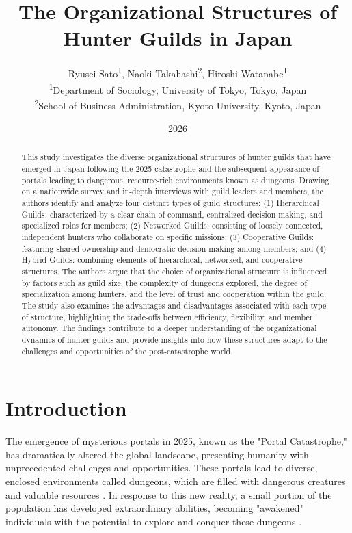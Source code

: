 \documentclass[12pt, a4paper]{article}
\title{The Organizational Structures of Hunter Guilds in Japan}
\author{
    Ryusei Sato\textsuperscript{1},
    Naoki Takahashi\textsuperscript{2},
    Hiroshi Watanabe\textsuperscript{1} \\
    \textsuperscript{1}Department of Sociology, University of Tokyo, Tokyo, Japan \\
    \textsuperscript{2}School of Business Administration, Kyoto University, Kyoto, Japan
}
\date{2026}
\begin{document}
\maketitle

\begin{abstract}
This study investigates the diverse organizational structures of hunter guilds that have emerged in Japan following the 2025 catastrophe and the subsequent appearance of portals leading to dangerous, resource-rich environments known as dungeons. Drawing on a nationwide survey and in-depth interviews with guild leaders and members, the authors identify and analyze four distinct types of guild structures: (1) Hierarchical Guilds: characterized by a clear chain of command, centralized decision-making, and specialized roles for members; (2) Networked Guilds: consisting of loosely connected, independent hunters who collaborate on specific missions; (3) Cooperative Guilds: featuring shared ownership and democratic decision-making among members; and (4) Hybrid Guilds: combining elements of hierarchical, networked, and cooperative structures. The authors argue that the choice of organizational structure is influenced by factors such as guild size, the complexity of dungeons explored, the degree of specialization among hunters, and the level of trust and cooperation within the guild. The study also examines the advantages and disadvantages associated with each type of structure, highlighting the trade-offs between efficiency, flexibility, and member autonomy. The findings contribute to a deeper understanding of the organizational dynamics of hunter guilds and provide insights into how these structures adapt to the challenges and opportunities of the post-catastrophe world.
\end{abstract}

\section{Introduction}
The emergence of mysterious portals in 2025, known as the "Portal Catastrophe," has dramatically altered the global landscape, presenting humanity with unprecedented challenges and opportunities. These portals lead to diverse, enclosed environments called dungeons, which are filled with dangerous creatures and valuable resources \cite{Nakamura2025}. In response to this new reality, a small portion of the population has developed extraordinary abilities, becoming "awakened" individuals with the potential to explore and conquer these dungeons \cite{Yamamoto2026}.
\end{document}
